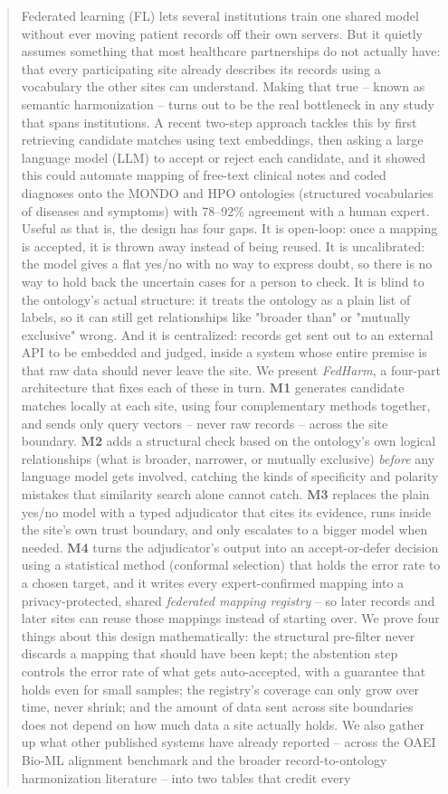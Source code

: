 \documentclass[conference]{IEEEtran}
\begin{document}
\begin{abstract}
Federated learning (FL) lets several institutions train one shared model without ever moving patient records off their own servers. But it quietly assumes something that most healthcare partnerships do not actually have: that every participating site already describes its records using a vocabulary the other sites can understand. Making that true -- known as semantic harmonization -- turns out to be the real bottleneck in any study that spans institutions. A recent two-step approach tackles this by first retrieving candidate matches using text embeddings, then asking a large language model (LLM) to accept or reject each candidate, and it showed this could automate mapping of free-text clinical notes and coded diagnoses onto the MONDO and HPO ontologies (structured vocabularies of diseases and symptoms) with 78--92\% agreement with a human expert. Useful as that is, the design has four gaps. It is open-loop: once a mapping is accepted, it is thrown away instead of being reused. It is uncalibrated: the model gives a flat yes/no with no way to express doubt, so there is no way to hold back the uncertain cases for a person to check. It is blind to the ontology's actual structure: it treats the ontology as a plain list of labels, so it can still get relationships like "broader than" or "mutually exclusive" wrong. And it is centralized: records get sent out to an external API to be embedded and judged, inside a system whose entire premise is that raw data should never leave the site. We present \emph{FedHarm}, a four-part architecture that fixes each of these in turn. \textbf{M1} generates candidate matches locally at each site, using four complementary methods together, and sends only query vectors -- never raw records -- across the site boundary. \textbf{M2} adds a structural check based on the ontology's own logical relationships (what is broader, narrower, or mutually exclusive) \emph{before} any language model gets involved, catching the kinds of specificity and polarity mistakes that similarity search alone cannot catch. \textbf{M3} replaces the plain yes/no model with a typed adjudicator that cites its evidence, runs inside the site's own trust boundary, and only escalates to a bigger model when needed. \textbf{M4} turns the adjudicator's output into an accept-or-defer decision using a statistical method (conformal selection) that holds the error rate to a chosen target, and it writes every expert-confirmed mapping into a privacy-protected, shared \emph{federated mapping registry} -- so later records and later sites can reuse those mappings instead of starting over. We prove four things about this design mathematically: the structural pre-filter never discards a mapping that should have been kept; the abstention step controls the error rate of what gets auto-accepted, with a guarantee that holds even for small samples; the registry's coverage can only grow over time, never shrink; and the amount of data sent across site boundaries does not depend on how much data a site actually holds. We also gather up what other published systems have already reported -- across the OAEI Bio-ML alignment benchmark and the broader record-to-ontology harmonization literature -- into two tables that credit every 
\end{abstract}
\end{document}
